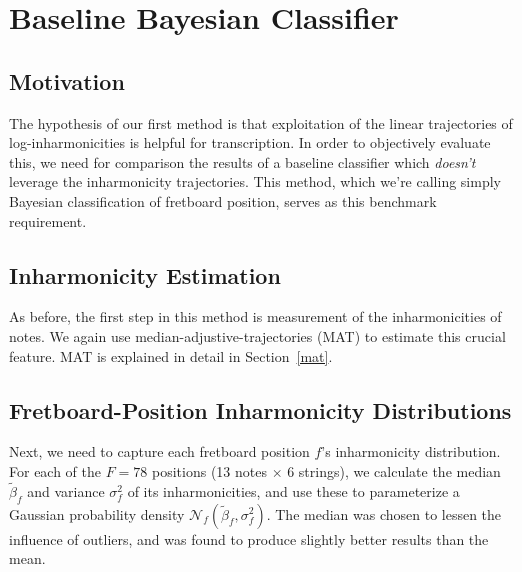 \documentclass[12pt]{cmuthesis}
\begin{document}
\section{Baseline Bayesian Classifier}
\subsection{Motivation}
The hypothesis of our first method is that exploitation of the linear trajectories of log-inharmonicities is helpful for transcription. In order to objectively evaluate this, we need for comparison the results of a baseline classifier which \textit{doesn't} leverage the inharmonicity trajectories. This method, which we're calling simply Bayesian classification of fretboard position, serves as this benchmark requirement. 

\subsection{Inharmonicity Estimation}
As before, the first step in this method is measurement of the inharmonicities of notes. We again use median-adjustive-trajectories (MAT) to estimate this crucial feature. MAT is explained in detail in Section~\ref{mat}.

\subsection{Fretboard-Position Inharmonicity Distributions}
Next, we need to capture each fretboard position $f$'s inharmonicity distribution. For each of the $F=78$ positions (13 notes $\times$ 6 strings), we calculate the median $\tilde{\beta}_f$ and variance $\sigma^2_f$ of its inharmonicities, and use these to parameterize a Gaussian probability density $\mathcal{N}_f(\tilde{\beta}_f,\sigma^2_f)$. The median was chosen to lessen the influence of outliers, and was found to produce slightly better results than the mean.
\end{document}
